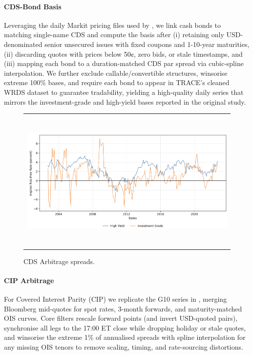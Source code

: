 \documentclass{article}
\begin{document}
\paragraph{CDS-Bond Basis}
Leveraging the daily Markit pricing files used by \citet{Siriwardane2021}, we link cash bonds to matching single-name CDS and compute the basis after (i) retaining only USD-denominated senior unsecured issues with fixed coupons and 1-10-year maturities, (ii) discarding quotes with prices below 50¢, zero bids, or stale timestamps, and (iii) mapping each bond to a duration-matched CDS par spread via cubic-spline interpolation.  We further exclude callable/convertible structures, winsorise extreme 100\% bases, and require each bond to appear in TRACE's cleaned WRDS dataset to guarantee tradability, yielding a high-quality daily series that mirrors the investment-grade and high-yield bases reported in the original study.


\begin{figure}[h!]
  \centering
  \begin{tabular}{@{}c@{}}
    \includegraphics[width=.7\linewidth,height=200pt,width=400pt]{../docs_src/CDS_replicate.png}
  \end{tabular}
  \caption{CDS Arbitrage spreads.}
  \label{fig:cds_basis}
\end{figure}

\paragraph{CIP Arbitrage}
For Covered Interest Parity (CIP) we replicate the G10 series in \citet{Du2018}, merging Bloomberg mid-quotes for spot rates, 3-month forwards, and maturity-matched OIS curves.  Core filters rescale forward points (and invert USD-quoted pairs), synchronise all legs to the 17:00 ET close while dropping holiday or stale quotes, and winsorise the extreme 1\% of annualised spreads with spline interpolation for any missing OIS tenors to remove scaling, timing, and rate-sourcing distortions.
\end{document}
